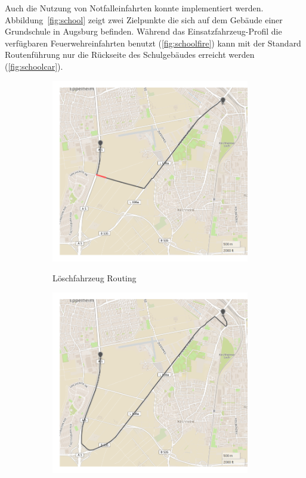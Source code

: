 Auch die Nutzung von Notfalleinfahrten konnte implementiert werden.
Abbildung~\ref{fig:school} zeigt zwei Zielpunkte die sich auf dem Gebäude einer Grundschule in Augsburg befinden. Während das Einsatzfahrzeug-Profil die verfügbaren Feuerwehreinfahrten benutzt (\ref{fig:schoolfire}) kann mit der Standard Routenführung nur die Rückseite des Schulgebäudes erreicht werden (\ref{fig:schoolcar}).

\begin{figure}[htb]
\centering
\begin{subfigure}{0.49\textwidth}
\centering
\includegraphics[width = 0.95\textwidth]{../media/notauffahrt.png} \\
\caption{Löschfahrzeug Routing}
\label{fig:emeramp}
\end{subfigure}
\begin{subfigure}{0.49\textwidth}
\centering
\includegraphics[width = 0.95\textwidth]{../media/normalauffahrt.png} \\

\end{subfigure}
\end{figure}
